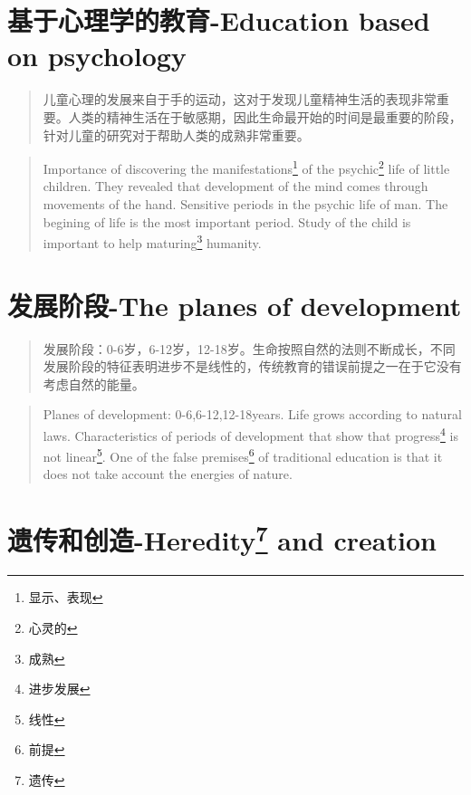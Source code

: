 \documentclass[lang=cn,10pt]{elegantbook}
\begin{document}
\chapter{基于心理学的教育-Education based on psychology}

\begin{quote}
{\small 儿童心理的发展来自于手的运动，这对于发现儿童精神生活的表现非常重要。人类的精神生活在于敏感期，因此生命最开始的时间是最重要的阶段，针对儿童的研究对于帮助人类的成熟非常重要。}
\end{quote}

\begin{tcolorbox}
\begin{quote}
{\small Importance of discovering the manifestations\footnote{显示、表现} of the psychic\footnote{心灵的} life of little children. They revealed that development of the mind comes through movements of the hand. Sensitive periods in the psychic life of man. The begining of life is the most important period. Study of the child is important to help maturing\footnote{成熟} humanity.}
\end{quote}
\end{tcolorbox}

\chapter{发展阶段-The planes of development}

\begin{quote}
{\small 发展阶段：0-6岁，6-12岁，12-18岁。生命按照自然的法则不断成长，不同发展阶段的特征表明进步不是线性的，传统教育的错误前提之一在于它没有考虑自然的能量。}
\end{quote}

\begin{tcolorbox}
\begin{quote}
{\small Planes of development: 0-6,6-12,12-18years. Life grows according to natural laws. Characteristics of periods of development that show that progress\footnote{进步发展} is not linear\footnote{线性}. One of the false premises\footnote{前提} of traditional education is that it does not take account the energies of nature.}
\end{quote}
\end{tcolorbox}

\chapter{遗传和创造-Heredity\footnote{遗传} and creation}
\end{document}
